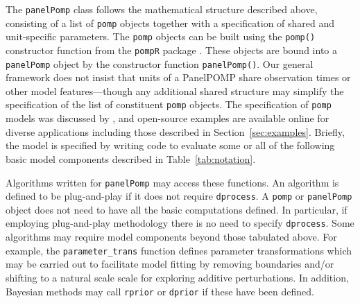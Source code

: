 \documentclass[12pt]{article}\usepackage[]{graphicx}\usepackage[table]{xcolor}
\newcommand\code{\texttt}
\newcommand\R{\texttt{R}\xspace}
\newcommand\panelPomp{\texttt{panelPomp}\xspace}
\newcommand\pomp{\texttt{pomp}\xspace}
\begin{document}
The \code{panelPomp} class follows the mathematical structure described above, consisting of a list of \code{pomp} objects together with a specification of shared and unit-specific parameters.
The \code{pomp} objects can be built using the \code{pomp()} constructor function from the \pomp \R package \citep{king16}.
These objects are bound into a \code{panelPomp} object by the constructor function \code{panelPomp()}.
Our general framework does not insist that units of a PanelPOMP share observation times or other model features---though any additional shared structure may simplify the specification of the list of constituent \code{pomp} objects.
The specification of \code{pomp} models was discussed by \citet{king16}, and open-source examples are available online for diverse applications including those described in Section~\ref{sec:examples}.
Briefly, the model is specified by writing code to evaluate some or all of the following basic model components described in Table~\ref{tab:notation}.

Algorithms written for \panelPomp may access these functions.
An algorithm is defined to be plug-and-play if it does not require \code{dprocess}.
A \code{pomp} or \code{panelPomp} object does not need to have all the basic computations defined.
In particular, if employing plug-and-play methodology there is no need to specify \code{dprocess}.
Some algorithms may require model components beyond those tabulated above.
For example, the \code{parameter\_trans} function defines parameter transformations which may be carried out to facilitate model fitting by removing boundaries and/or shifting to a natural scale scale for exploring additive perturbations.
In addition, Bayesian methods may call \code{rprior} or \code{dprior} if these have been defined.
\end{document}
